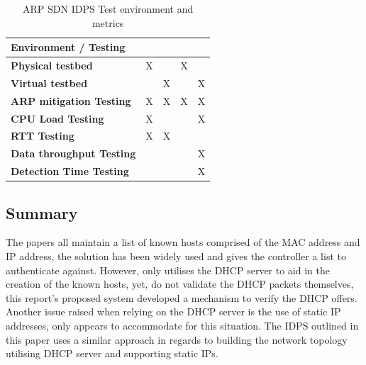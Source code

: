 \documentclass[12pt, oneside]{book}
\begin{document}
\begin{table}[H]
	\centering
	\begin{tabular}{|l|c|c|c|c|}
		\hline
		\rowcolor[HTML]{C0C0C0} 
		\textbf{Environment / Testing}  & \cite{alharbi2016securing} & \cite{matties2017distributed} & \cite{masoud2015preventing} & \cite{abdelsalam2015mitigating} \\ \hline
		\textbf{Physical testbed}        &        X              &                       &           X           &                       \\ \hline
		\textbf{Virtual testbed}         &                       &          X            &                       &            X          \\ \hline
		\textbf{ARP mitigation Testing}  &        X              &          X            &           X           &            X          \\ \hline
		\textbf{CPU Load Testing}        &        X              &                       &                       &            X          \\ \hline
		\textbf{RTT Testing}             &        X              &          X            &                       &                       \\ \hline
		\textbf{Data throughput Testing} &                       &                       &                       &            X          \\ \hline
		\textbf{Detection Time Testing}  &                       &                       &                       &            X          \\ \hline
	\end{tabular}
	\caption{ARP SDN IDPS Test environment and metrics}
	\label{table:IDPSTestingComp}
\end{table}

\subsection{Summary}
The papers \cite{matties2017distributed}\cite{masoud2015preventing}\cite{abdelsalam2015mitigating} all maintain a list of known hosts
comprised of the MAC address and IP address, the solution has been widely used and gives the controller a list to authenticate against.
However, only \cite{masoud2015preventing}\cite{abdelsalam2015mitigating} utilises the DHCP server to aid in the creation of the known
hosts,
yet, do not validate the DHCP packets themselves, this report's proposed system developed a mechanism
to verify the DHCP offers.
Another issue raised when relying on the DHCP server is the use of 
static IP addresses, only \cite{masoud2015preventing} appears to accommodate for this situation. The IDPS outlined in this paper
uses a similar approach in regards to building the network topology utilising DHCP server and supporting static IPs.\newline
\end{document}

